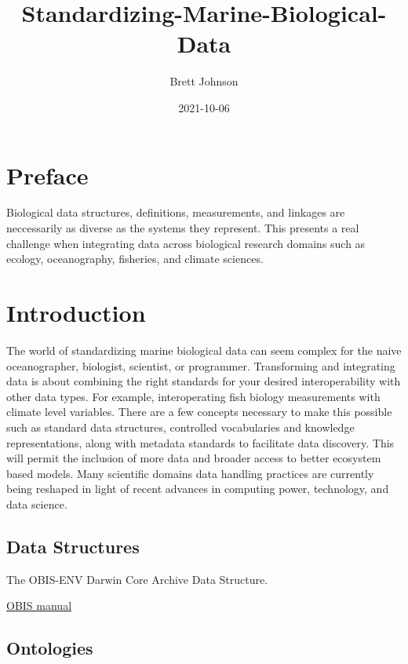 \documentclass[
]{book}
\title{Standardizing-Marine-Biological-Data}
\author{Brett Johnson}
\date{2021-10-06}
\begin{document}
\maketitle

{
\setcounter{tocdepth}{1}
\tableofcontents
}
\hypertarget{preface}{%
\chapter*{Preface}\label{preface}}

Biological data structures, definitions, measurements, and linkages are neccessarily as diverse as the systems they represent. This presents a real challenge when integrating data across biological research domains such as ecology, oceanography, fisheries, and climate sciences.

\hypertarget{intro}{%
\chapter{Introduction}\label{intro}}

The world of standardizing marine biological data can seem complex for the naive oceanographer, biologist, scientist, or programmer.
Transforming and integrating data is about combining the right standards for your desired interoperability with other data types.
For example, interoperating fish biology measurements with climate level variables.
There are a few concepts necessary to make this possible such as standard data structures, controlled vocabularies and knowledge representations, along with metadata standards to facilitate data discovery. This will permit the inclusion of more data and broader access to better ecosystem based models. Many scientific domains data handling practices are currently being reshaped in light of recent advances in computing power, technology, and data science.

\hypertarget{data-structures}{%
\section{Data Structures}\label{data-structures}}

The OBIS-ENV Darwin Core Archive Data Structure.

\href{https://obis.org/manual/}{OBIS manual}

\hypertarget{ontologies}{%
\section{Ontologies}\label{ontologies}}
\end{document}
